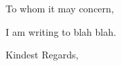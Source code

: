 
\signature{David Andrews}
\address{Address here\\
david.andrews112@gmail.com \ \ \ \ Phone here}



\begin{letter}{}
\opening{To whom it may concern,}

I am writing to blah blah.

\closing{Kindest Regards,}
\end{letter}
 



